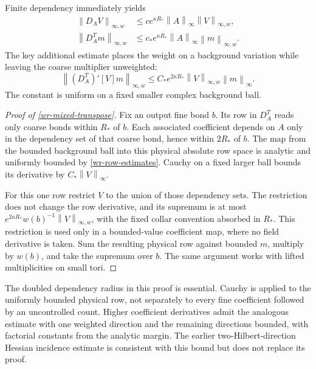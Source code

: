 \documentclass[11pt]{article}
\theoremstyle{remark}
\newcommand{\norm}[1]{\left\|#1\right\|}
\begin{document}
Finite dependency immediately yields
\begin{equation}\label{wr-weighted-rows}
 \begin{split}
 \norm{D_AV}_{\infty,w}
 &\le ce^{\kappa R_*}\norm{A}_\infty\norm{V}_{\infty,w},\\
 \norm{D_A^Tm}_{\infty,w}
 &\le c_*e^{\kappa R_*}\norm{A}_\infty\norm{m}_{\infty,w}.
 \end{split}
\end{equation}
The key additional estimate places the weight on a background
variation while leaving the coarse multiplier unweighted:
\begin{equation}\label{wr-mixed-transpose}
 \boxed{\quad
 \norm{(D_A^T)'[V]m}_{\infty,w}
 \le C_*e^{2\kappa R_*}\norm{V}_{\infty,w}\norm{m}_\infty.
 \quad}
\end{equation}
The constant is uniform on a fixed smaller complex background
ball.

\begin{proof}[Proof of \eqref{wr-mixed-transpose}]
Fix an output fine bond $b$. Its row in $D_A^T$ reads only coarse
bonds within $R_*$ of $b$. Each associated coefficient depends on
$A$ only in the dependency set of that coarse bond, hence within
$2R_*$ of $b$. The map from the bounded background ball into this
physical absolute row space is analytic and uniformly bounded
by \eqref{wr-row-estimates}. Cauchy on a fixed larger ball bounds
its derivative by $C_*\norm{V}_\infty$.

For this one row restrict $V$ to the union of those dependency
sets. The restriction does not change the row derivative, and its
supremum is at most
$e^{2\kappa R_*}w(b)^{-1}\norm{V}_{\infty,w}$, with the fixed
collar convention absorbed in $R_*$. This restriction is used
only in a bounded-value coefficient map, where no field derivative
is taken. Sum the resulting physical row against bounded $m$,
multiply by $w(b)$, and take the supremum over $b$.
The same argument works with lifted multiplicities on small tori.
\end{proof}

The doubled dependency radius in this proof is essential.
Cauchy is applied to the uniformly bounded physical row, not
separately to every fine coefficient followed by an uncontrolled
count. Higher coefficient derivatives admit the analogous estimate
with one weighted direction and the remaining directions bounded,
with factorial constants from the analytic margin. The earlier
two-Hilbert-direction Hessian incidence estimate is consistent
with this bound but does not replace its proof.
\end{document}
